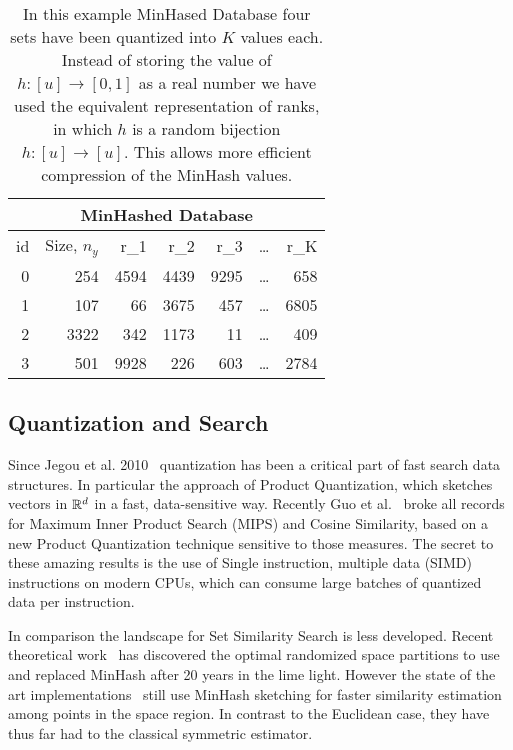 \begin{table}
\centering
 \begin{tabular}{|r|r| r r r r r|} 
 \hline
     \multicolumn{7}{|c|}{MinHashed Database} \\
 \hline
 id & Size, $n_y$  & r_1 & r_2 & r_3 & \dots & r_K \\
 \hline
 0 & 254 & 4594 & 4439 & 9295 & \dots & 658  \\
 1 & 107 & 66 & 3675 & 457 &     \dots & 6805  \\
 2 & 3322 & 342 & 1173 & 11 &    \dots & 409  \\
 3 & 501 & 9928 & 226 & 603 &    \dots & 2784  \\
  \hline
 \end{tabular}
 \caption{In this example MinHased Database four sets have been quantized into $K$ values each.
    Instead of storing the value of $h:[u]\to[0,1]$ as a real number we have used the equivalent representation of ranks, in which $h$ is a random bijection $h:[u]\to[u]$.
    This allows more efficient compression of the MinHash values.
 }
\end{table}





\subsection{Quantization and Search}

Since Jegou et al. 2010~\cite{jegou2010product} quantization has been a critical part of fast search data structures.
In particular the approach of Product Quantization, which sketches vectors in $\mathbb{R}^d$ in a fast, data-sensitive way.
Recently Guo et al.~\cite{guo2020accelerating} broke all records~\cite{aumuller2017ann} for Maximum Inner Product Search (MIPS) and Cosine Similarity, based on a new Product Quantization technique sensitive to those measures.
The secret to these amazing results is the use of Single instruction, multiple data (SIMD) instructions on modern CPUs, which can consume large batches of quantized data per instruction.

In comparison the landscape for Set Similarity Search is less developed.
Recent theoretical work~\cite{christiani2017set, DBLP:conf/focs/AhleK20} has discovered the optimal randomized space partitions to use and replaced MinHash after 20 years in the lime light.
However the state of the art implementations~\cite{christiani2018scalable} still use MinHash sketching for faster similarity estimation among points in the space region.
In contrast to the Euclidean case, they have thus far had to the classical symmetric estimator.


